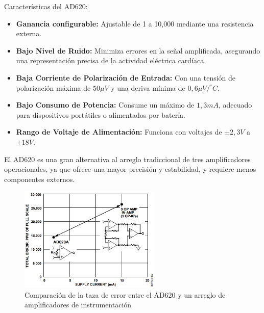             \hfill \break
            Características del AD620:
            \begin{itemize}
                \item \textbf{Ganancia configurable:} Ajustable de 1 a 10,000 mediante una resistencia externa.
                \item \textbf{Bajo Nivel de Ruido:} Minimiza errores en la señal amplificada, asegurando una representación precisa de la actividad eléctrica cardíaca.
                \item \textbf{Baja Corriente de Polarización de Entrada:} Con una tensión de polarización máxima de $50 \mu V$ y una deriva mínima de $0,6 \mu V / ^{\circ} C$.
                \item \textbf{Bajo Consumo de Potencia:} Consume un máximo de $1,3 mA$, adecuado para dispositivos portátiles o alimentados por batería.
                \item \textbf{Rango de Voltaje de Alimentación:} Funciona con voltajes de $\pm 2,3 V$ a $\pm 18 V$.
            \end{itemize}

            El AD620 es una gran alternativa al arreglo tradiccional de tres amplificadores operacionales, ya que ofrece una mayor precisión y estabilidad, y requiere menos componentes externos. 

            \begin{figure}[H]
                \centering
                \includegraphics[width=0.6\textwidth]{img/Desarrollo/Amplificador_AD620_comparacion.png}
                \caption[Comparación de la taza de error entre el AD620 y un arreglo de amplificadores de instrumentación.]{Comparación de la taza de error entre el AD620 y un arreglo de amplificadores de instrumentación\footnotemark}
                \label{fig:Amplificador_AD620_comparacion}
            \end{figure}

